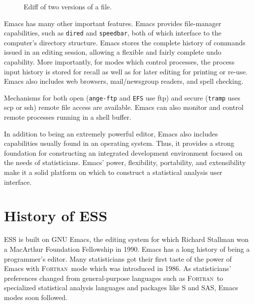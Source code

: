 \documentclass{article}
\newcommand*{\SAS}{\textsc{SAS}}
\newcommand*{\Fortran}{\textsc{Fortran}}
\newcommand{\stexttt}[1]{{\small\texttt{#1}}}
\begin{document}
\begin{figure}[tbp]
  \caption{Ediff of two versions of a file.}
  \label{f.ediff}
\end{figure}

Emacs has many other important features.  Emacs provides file-manager
capabilities, such as \stexttt{dired}
and \stexttt{speedbar}, both of which interface to the
computer's directory structure.  Emacs stores the complete history of
commands issued in an editing session, allowing a flexible and fairly
complete undo capability.  More importantly, for modes which control
processes, the process input history is stored for recall as well as
for later editing for printing or re-use.  Emacs also includes web
browsers, mail/newsgroup readers, and spell checking.

Mechanisms for both open (\stexttt{ange-ftp} and \stexttt{EFS} use
ftp) and secure (\stexttt{tramp} uses scp or ssh) remote file access are
available.  Emacs can also monitor and control remote processes
running in a shell buffer.

In addition to being an extremely powerful editor, Emacs also
includes capabilities usually found in an operating system.  Thus, it
provides a strong foundation for constructing an integrated
development environment focused on the needs of statisticians.  Emacs'
power, flexibility, portability, and extensibility make it a solid
platform on which to construct a statistical analysis user interface.

\section{History of ESS}
\label{sec:ESS:history}

ESS is built on GNU Emacs, the editing system for which Richard
Stallman won a MacArthur Foundation Fellowship in 1990.  Emacs has a
long history of being a programmer's editor.  Many statisticians got
their first taste of the power of Emacs with \Fortran\ mode which was
introduced in 1986.  As statisticians' preferences changed from
general-purpose languages such as \Fortran\ to specialized
statistical analysis languages and packages like S and \SAS, Emacs
modes soon followed.
\end{document}
